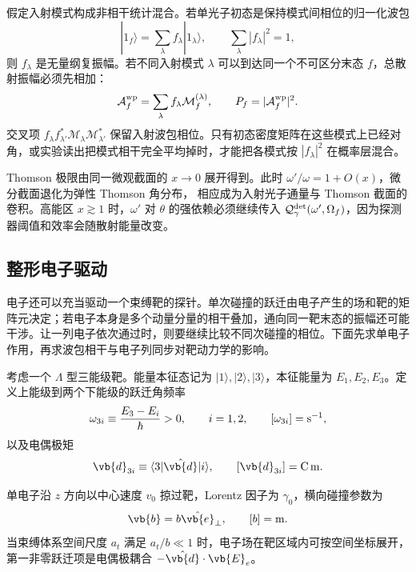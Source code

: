  假定入射模式构成非相干统计混合。若单光子初态是保持模式间相位的归一化波包
\begin{equation*}
|1_f\rangle
=\sum_\lambda f_\lambda|1_\lambda\rangle,
\qquad
\sum_\lambda|f_\lambda|^2=1,
\end{equation*}
则 $f_\lambda$ 是无量纲复振幅。若不同入射模式 $\lambda$ 可以到达同一个不可区分末态 $f$，总散射振幅必须先相加：
\begin{equation*}
\mathcal A_f^{\rm wp}
=\sum_\lambda f_\lambda\mathcal M_f^{(\lambda)},
\qquad
P_f=|\mathcal A_f^{\rm wp}|^2.
\end{equation*}
交叉项 $f_\lambda f_{\lambda'}^*\mathcal M_\lambda\mathcal M_{\lambda'}^*$ 保留入射波包相位。只有初态密度矩阵在这些模式上已经对角，或实验读出把模式相干完全平均掉时，才能把各模式按 $|f_\lambda|^2$ 在概率层混合。

Thomson 极限由同一微观截面的 $x\to0$ 展开得到。此时 $\omega'/\omega=1+O(x)$，微分截面退化为弹性 Thomson 角分布， 相应成为入射光子通量与 Thomson 截面的卷积。高能区 $x\gtrsim1$ 时，$\omega'$ 对 $\theta$ 的强依赖必须继续传入 $\mathcal Q_{\gamma}^{\rm det}(\omega',\Omega_f)$，因为探测器阈值和效率会随散射能量改变。

\subsection{整形电子驱动}\label{subsec:shaped-electron-drive-dp19}

电子还可以充当驱动一个束缚靶的探针。单次碰撞的跃迁由电子产生的场和靶的矩阵元决定；若电子本身是多个动量分量的相干叠加，通向同一靶末态的振幅还可能干涉。让一列电子依次通过时，则要继续比较不同次碰撞的相位。下面先求单电子作用，再求波包相干与电子列同步对靶动力学的影响。

考虑一个 $\Lambda$ 型三能级靶。能量本征态记为 $|1\rangle,|2\rangle,|3\rangle$，本征能量为 $E_1,E_2,E_3$。定义上能级到两个下能级的跃迁角频率
\begin{equation*}
\omega_{3i}\equiv\frac{E_3-E_i}{\hbar}>0,
\qquad i=1,2,
\qquad [\omega_{3i}]={\rm s^{-1}},
\end{equation*}
以及电偶极矩
\begin{equation*}
\vb{d}_{3i}\equiv\langle3|\hat{\vb{d}}|i\rangle,
\qquad
[\vb{d}_{3i}]={\rm C\,m}.
\end{equation*}

单电子沿 $z$ 方向以中心速度 $v_0$ 掠过靶，Lorentz 因子为 $\gamma_0$，横向碰撞参数为
\begin{equation*}
\vb{b}=b\hat{\vb{e}}_\perp,
\qquad [b]={\rm m}.
\end{equation*}
当束缚体系空间尺度 $a_t$ 满足 $a_t/b\ll1$ 时，电子场在靶区域内可按空间坐标展开，第一非零跃迁项是电偶极耦合 $-\hat{\vb{d}}\cdot\vb{E}_e$。


